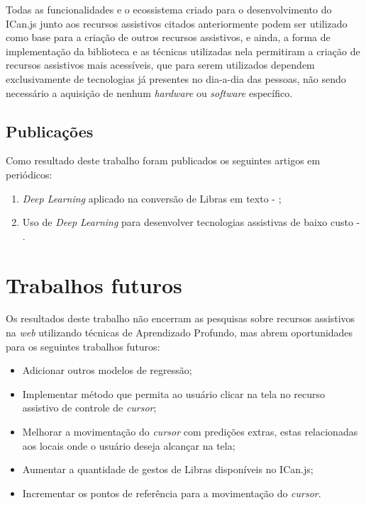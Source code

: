 \par Todas as funcionalidades e o ecossistema criado para o desenvolvimento do ICan.js junto aos recursos assistivos citados anteriormente podem ser utilizado como base para a criação de outros recursos assistivos, e ainda, a forma de implementação da biblioteca e as técnicas utilizadas nela permitiram a criação de recursos assistivos mais acessíveis, que para serem utilizados dependem exclusivamente de tecnologias já presentes no dia-a-dia das pessoas, não sendo necessário a aquisição de nenhum \textit{hardware} ou \textit{software} específico.

\subsection{Publicações}

\par Como resultado deste trabalho foram publicados os seguintes artigos em periódicos:

\begin{enumerate}
    \item \textit{Deep Learning} aplicado na conversão de Libras em texto - \cite{fmenino2019a};
    \item Uso de \textit{Deep Learning} para desenvolver tecnologias assistivas de baixo custo - \cite{fmenino2019b}.
\end{enumerate}

\section{Trabalhos futuros}

Os resultados deste trabalho não encerram as pesquisas sobre recursos assistivos na \textit{web} utilizando técnicas de Aprendizado Profundo, mas abrem oportunidades para os seguintes trabalhos futuros:

\begin{itemize}
    \item Adicionar outros modelos de regressão;
    \item Implementar método que permita ao usuário clicar na tela no recurso assistivo de controle de \textit{cursor};
    \item Melhorar a movimentação do \textit{cursor} com predições extras, estas relacionadas aos locais onde o usuário deseja alcançar na tela;
    \item Aumentar a quantidade de gestos de Libras disponíveis no ICan.js;
    \item Incrementar os pontos de referência para a movimentação do \textit{cursor}.
\end{itemize}
